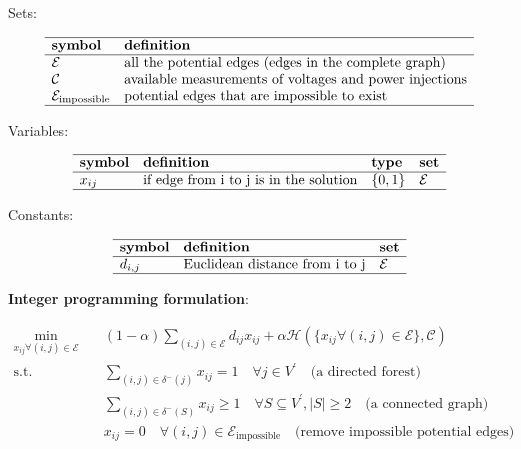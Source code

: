 \documentclass[
]{book}
\begin{document}
Sets:

\[
\begin{array}{ll}
  \hline
  \textbf{symbol} & \textbf{definition} \\
  \hline
  \mathcal{E}
  & \text{all the potential edges (edges in the complete graph)} \\
  \mathcal{C}
  & \text{available measurements of voltages and power injections} \\
  \mathcal{E}_\text{impossible}
  & \text{potential edges that are impossible to exist} \\
  \hline
\end{array}
\]

Variables:

\[
\begin{array}{llll}
  \hline
  \textbf{symbol} & \textbf{definition} & \textbf{type} & \textbf{set} \\
  \hline
  x_{i j} & \text{if edge from i to j is in the solution}
  & \{0, 1\} & \mathcal{E} \\
  \hline
\end{array}
\]

Constants:

\[
\begin{array}{lll}
  \hline
  \textbf{symbol} & \textbf{definition} & \textbf{set} \\
  \hline
  d_{i, j} & \text{Euclidean distance from i to j}
  & \mathcal{E} \\
  \hline
\end{array}
\]

\textbf{Integer programming formulation}:

\[
\begin{aligned}
  \min_{x_{i j} \forall (i, j) \in \mathcal{E}} \quad
    & (1 - \alpha) \sum_{(i, j) \in \mathcal{E}} d_{i j} x_{i j}
    + \alpha \mathcal{H}
    \left(\{x_{i j} \forall (i, j) \in \mathcal{E} \}, \mathcal{C} \right) \\
  \text{s.t.} \quad & \sum_{(i, j) \in \delta^{-}(j)} x_{i j} = 1
    \quad \forall j \in V^{\prime}
    \quad \text{(a directed forest)} \\
  & \sum_{(i, j) \in \delta^{-}(S)} x_{i j} \geq 1
    \quad \forall S \subseteq V^{\prime},|S| \geq 2
    \quad \text{(a connected graph)} \\
  & x_{i j} = 0
    \quad \forall (i, j) \in \mathcal{E}_\text{impossible}
    \quad \text{(remove impossible potential edges)}
\end{aligned}
\]
\end{document}

